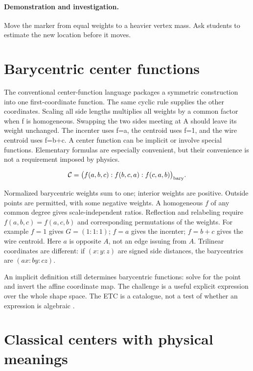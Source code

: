 \documentclass[11pt,oneside,openany]{book}
\newcommand{\TC}{\mathcal C}\newcommand{\mean}{\operatorname{mean}}
\begin{document}
\paragraph{Demonstration and investigation.} Move the marker from equal weights to a heavier vertex mass. Ask students to estimate the new location before it moves.


\section{Barycentric center functions}\label{sec:slide5}

The conventional center-function language packages a symmetric construction into one first-coordinate function. The same cyclic rule supplies the other coordinates. Scaling all side lengths multiplies all weights by a common factor when f is homogeneous. Swapping the two sides meeting at A should leave its weight unchanged. The incenter uses f=a, the centroid uses f=1, and the wire centroid uses f=b+c. A center function can be implicit or involve special functions. Elementary formulas are especially convenient, but their convenience is not a requirement imposed by physics.


\[\TC=\bigl(f(a,b,c):f(b,c,a):f(c,a,b)\bigr)_{\rm bary}.\]



Normalized barycentric weights sum to one; interior weights are positive.
Outside points are permitted, with some negative weights.
A homogeneous $f$ of any common degree gives scale-independent ratios.
Reflection and relabeling require $f(a,b,c)=f(a,c,b)$ and corresponding
permutations of the weights. For example $f=1$ gives $G=(1:1:1)$;
$f=a$ gives the incenter; $f=b+c$ gives the wire centroid.
Here $a$ is opposite $A$, not an edge issuing from $A$.
Trilinear coordinates are different: if $(x:y:z)$ are signed side
distances, the barycentrics are $(ax:by:cz)$.

An implicit definition still determines barycentric functions: solve
for the point and invert the affine coordinate map. The challenge is
a useful explicit expression over the whole shape space. The ETC is
a catalogue, not a test of whether an expression is algebraic \cite{etc}.




\section{Classical centers with physical meanings}\label{sec:slide6}
\end{document}
